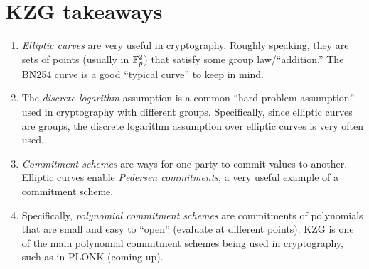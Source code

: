 \section{KZG takeaways}
\begin{tcolorbox}[takeaways]
\begin{enumerate}
\item
  \emph{Elliptic curves} are very useful in cryptography. Roughly
  speaking, they are sets of points (usually in $\mathbb{F}_{p}^{2}$)
  that satisfy some group law/``addition.'' The BN254 curve is a good
  ``typical curve'' to keep in mind.
\item
  The \emph{discrete logarithm} assumption is a common ``hard problem
  assumption'' used in cryptography with different groups. Specifically,
  since elliptic curves are groups, the discrete logarithm assumption
  over elliptic curves is very often used.
\item
  \emph{Commitment schemes} are ways for one party to commit values to
  another. Elliptic curves enable \emph{Pedersen commitments}, a very
  useful example of a commitment scheme.
\item
  Specifically, \emph{polynomial commitment schemes} are commitments of
  polynomials that are small and easy to ``open'' (evaluate at different
  points). KZG is one of the main polynomial commitment schemes being
  used in cryptography, such as in PLONK (coming up).
\end{enumerate}
\end{tcolorbox}
